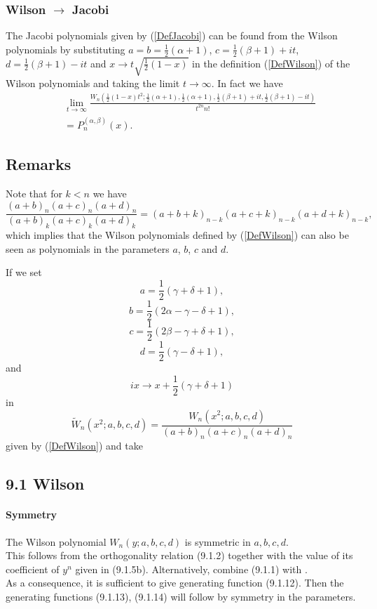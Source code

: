 \documentclass[envcountchap,graybox]{svmono}
\newcounter{rom}
\begin{document}
\subsubsection*{Wilson $\rightarrow$ Jacobi}
The Jacobi polynomials given by (\ref{DefJacobi}) can be found from the Wilson
polynomials by substituting $a=b=\frac{1}{2}(\alpha+1)$, $c=\frac{1}{2}(\beta+1)+it$,
$d=\frac{1}{2}(\beta+1)-it$ and $x\rightarrow t\sqrt{\frac{1}{2}(1-x)}$ in the
definition (\ref{DefWilson}) of the Wilson polynomials and taking the limit
$t\rightarrow\infty$. In fact we have
\begin{eqnarray}
& &\lim_{t\rightarrow\infty}\frac{W_n(\frac{1}{2}(1-x)t^2;\frac{1}{2}(\alpha+1),
\frac{1}{2}(\alpha+1),\frac{1}{2}(\beta+1)+it,\frac{1}{2}(\beta+1)-it)}{t^{2n}n!}\nonumber\\
& &{}=P_n^{(\alpha,\beta)}(x).
\end{eqnarray}

\subsection*{Remarks}
Note that for $k<n$ we have
$$\frac{(a+b)_n(a+c)_n(a+d)_n}{(a+b)_k(a+c)_k(a+d)_k}=(a+b+k)_{n-k}(a+c+k)_{n-k}(a+d+k)_{n-k},$$
which implies that the Wilson polynomials defined by (\ref{DefWilson}) can also be
seen as polynomials in the parameters $a$, $b$, $c$ and $d$.

\noindent
If we set
$$a=\textstyle\frac{1}{2}(\gamma+\delta+1),$$
$$b=\textstyle\frac{1}{2}(2\alpha-\gamma-\delta+1),$$
$$c=\textstyle\frac{1}{2}(2\beta-\gamma+\delta+1),$$
$$d=\textstyle\frac{1}{2}(\gamma-\delta+1),$$
and
$$ix\rightarrow x+\textstyle\frac{1}{2}(\gamma+\delta+1)$$
in
\begin{equation}
{\tilde{W}}_n(x^2;a,b,c,d)=\frac{W_n(x^2;a,b,c,d)}{(a+b)_n(a+c)_n(a+d)_n}
\end{equation}
given by (\ref{DefWilson}) and take
\subsection*{9.1 Wilson}
\label{sec9.1}
%
\paragraph{Symmetry}
The Wilson polynomial $W_n(y;a,b,c,d)$ is symmetric
in $a,b,c,d$.
\\
This follows from the orthogonality relation (9.1.2)
together with the value of its coefficient of $y^n$ given in (9.1.5b).
Alternatively, combine (9.1.1) with .\\
As a consequence, it is sufficient to give generating function (9.1.12). Then the generating
functions (9.1.13), (9.1.14) will follow by symmetry in the parameters.
%
\end{document}
